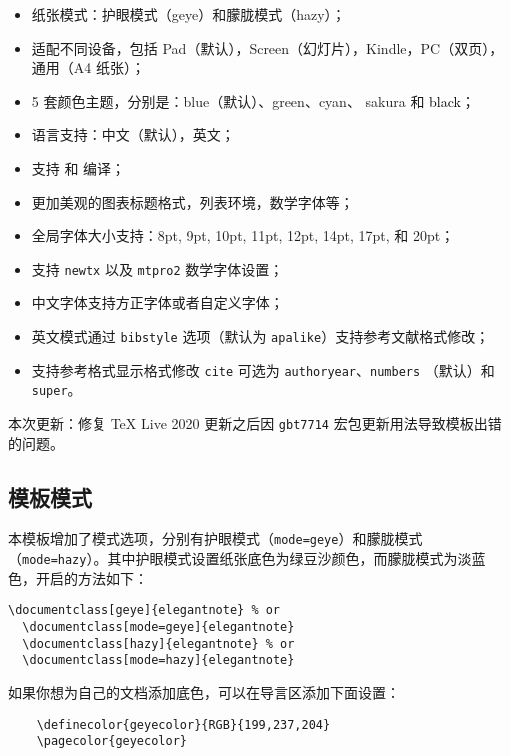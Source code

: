 \documentclass[cn,geye,blue,14pt,normal]{elegantnote}
\begin{document}
\begin{itemize}
  \item 纸张模式：护眼模式（geye）和朦胧模式（hazy）；
  \item 适配不同设备，包括 Pad（默认），Screen（幻灯片），Kindle，PC（双页），通用（A4 纸张）；
  \item 5 套颜色主题，分别是：\textcolor{eblue}{blue}（默认）、\textcolor{egreen}{green}、\textcolor{ecyan}{cyan}、 \textcolor{sakura}{sakura} 和 \textcolor{black}{black}；
  \item 语言支持：中文（默认），英文；
  \item 支持  和  编译；
  \item 更加美观的图表标题格式，列表环境，数学字体等；
  \item 全局字体大小支持：8pt, 9pt, 10pt, 11pt, 12pt, 14pt, 17pt, 和 20pt；
  \item 支持 \lstinline{newtx} 以及 \lstinline{mtpro2} 数学字体设置；
  \item 中文字体支持方正字体或者自定义字体；
  \item 英文模式通过 \lstinline{bibstyle} 选项（默认为 \lstinline{apalike}）支持参考文献格式修改；
  \item 支持参考格式显示格式修改 \lstinline{cite} 可选为 \lstinline{authoryear}、\lstinline{numbers} （默认）和 \lstinline{super}。
\end{itemize}

本次更新：修复 \TeX{} Live 2020 更新之后因 \lstinline{gbt7714} 宏包更新用法导致模板出错的问题。

\subsection{模板模式}

本模板增加了模式选项，分别有护眼模式（\lstinline{mode=geye}）和朦胧模式（\lstinline{mode=hazy}）。其中护眼模式设置纸张底色为绿豆沙颜色，而朦胧模式为淡蓝色，开启的方法如下：
\begin{lstlisting}[frame=none]  
  \documentclass[geye]{elegantnote} % or
  \documentclass[mode=geye]{elegantnote}
  \documentclass[hazy]{elegantnote} % or
  \documentclass[mode=hazy]{elegantnote}
\end{lstlisting}

\begin{remark}
  如果你想为自己的文档添加底色，可以在导言区添加下面设置：
  \begin{lstlisting}
    \definecolor{geyecolor}{RGB}{199,237,204}
    \pagecolor{geyecolor}
  \end{lstlisting}
\end{remark}
\end{document}
